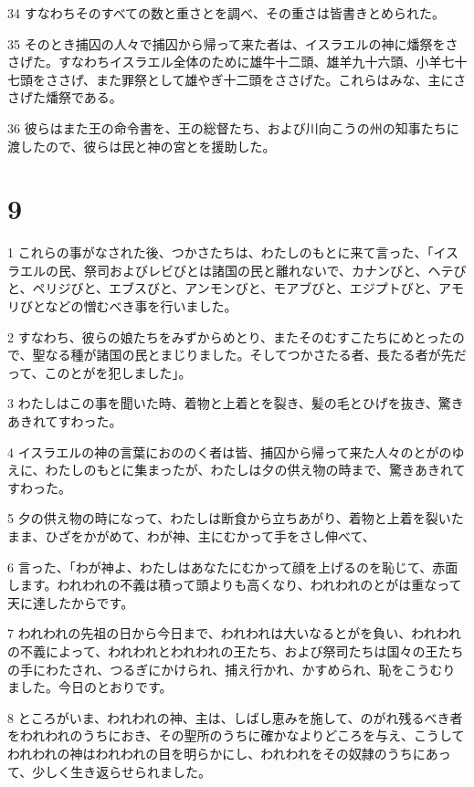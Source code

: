 \par 34 すなわちそのすべての数と重さとを調べ、その重さは皆書きとめられた。
\par 35 そのとき捕囚の人々で捕囚から帰って来た者は、イスラエルの神に燔祭をささげた。すなわちイスラエル全体のために雄牛十二頭、雄羊九十六頭、小羊七十七頭をささげ、また罪祭として雄やぎ十二頭をささげた。これらはみな、主にささげた燔祭である。
\par 36 彼らはまた王の命令書を、王の総督たち、および川向こうの州の知事たちに渡したので、彼らは民と神の宮とを援助した。

\chapter{9}

\par 1 これらの事がなされた後、つかさたちは、わたしのもとに来て言った、「イスラエルの民、祭司およびレビびとは諸国の民と離れないで、カナンびと、ヘテびと、ペリジびと、エブスびと、アンモンびと、モアブびと、エジプトびと、アモリびとなどの憎むべき事を行いました。
\par 2 すなわち、彼らの娘たちをみずからめとり、またそのむすこたちにめとったので、聖なる種が諸国の民とまじりました。そしてつかさたる者、長たる者が先だって、このとがを犯しました」。
\par 3 わたしはこの事を聞いた時、着物と上着とを裂き、髪の毛とひげを抜き、驚きあきれてすわった。
\par 4 イスラエルの神の言葉におののく者は皆、捕囚から帰って来た人々のとがのゆえに、わたしのもとに集まったが、わたしは夕の供え物の時まで、驚きあきれてすわった。
\par 5 夕の供え物の時になって、わたしは断食から立ちあがり、着物と上着を裂いたまま、ひざをかがめて、わが神、主にむかって手をさし伸べて、
\par 6 言った、「わが神よ、わたしはあなたにむかって顔を上げるのを恥じて、赤面します。われわれの不義は積って頭よりも高くなり、われわれのとがは重なって天に達したからです。
\par 7 われわれの先祖の日から今日まで、われわれは大いなるとがを負い、われわれの不義によって、われわれとわれわれの王たち、および祭司たちは国々の王たちの手にわたされ、つるぎにかけられ、捕え行かれ、かすめられ、恥をこうむりました。今日のとおりです。
\par 8 ところがいま、われわれの神、主は、しばし恵みを施して、のがれ残るべき者をわれわれのうちにおき、その聖所のうちに確かなよりどころを与え、こうしてわれわれの神はわれわれの目を明らかにし、われわれをその奴隷のうちにあって、少しく生き返らせられました。
